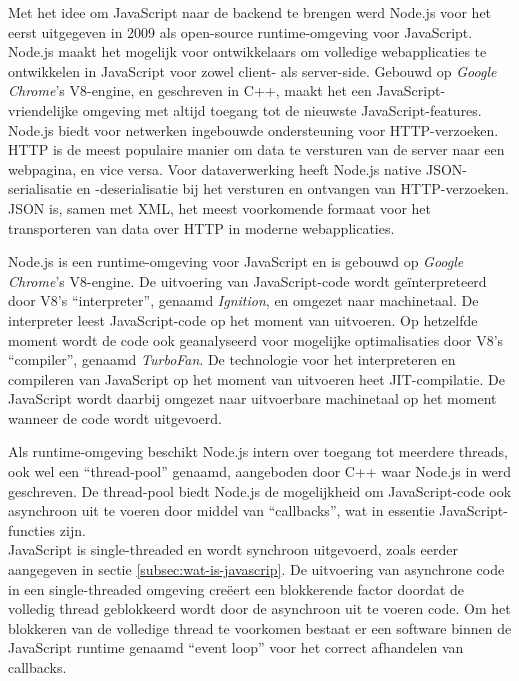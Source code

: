 Met het idee om JavaScript naar de backend te brengen werd Node.js voor het eerst uitgegeven in 2009 als open-source runtime-omgeving voor JavaScript. Node.js maakt het mogelijk voor ontwikkelaars om volledige webapplicaties te ontwikkelen in JavaScript voor zowel client- als server-side. Gebouwd op \emph{Google Chrome}'s V8-engine, en geschreven in C++, maakt het een JavaScript-vriendelijke omgeving met altijd toegang tot de nieuwste JavaScript-features. \\
Node.js biedt voor netwerken ingebouwde ondersteuning voor \gls{HTTP}-verzoeken. \gls{HTTP} is de meest populaire manier om data te versturen van de server naar een webpagina, en vice versa. Voor dataverwerking heeft Node.js native \gls{JSON}-serialisatie en -deserialisatie bij het versturen en ontvangen van \gls{HTTP}-verzoeken. \gls{JSON} is, samen met \gls{XML}, het meest voorkomende formaat voor het transporteren van data over \gls{HTTP} in moderne webapplicaties.

Node.js is een runtime-omgeving voor JavaScript en is gebouwd op \emph{Google Chrome}'s V8-engine. De uitvoering van JavaScript-code wordt geïnterpreteerd door V8's ``interpreter'', genaamd \emph{Ignition}, en omgezet naar machinetaal. De interpreter leest JavaScript-code op het moment van uitvoeren. Op hetzelfde moment wordt de code ook geanalyseerd voor mogelijke optimalisaties door V8's ``compiler'', genaamd \emph{TurboFan}. De technologie voor het interpreteren en compileren van JavaScript op het moment van uitvoeren heet \gls{JIT}-compilatie. De JavaScript wordt daarbij omgezet naar uitvoerbare machinetaal op het moment wanneer de code wordt uitgevoerd.

Als runtime-omgeving beschikt Node.js intern over toegang tot meerdere threads, ook wel een ``thread-pool'' genaamd, aangeboden door C++ waar Node.js in werd geschreven. De thread-pool biedt Node.js de mogelijkheid om JavaScript-code ook asynchroon uit te voeren door middel van ``callbacks'', wat in essentie JavaScript-functies zijn. \\
JavaScript is single-threaded en wordt synchroon uitgevoerd, zoals eerder aangegeven in sectie \ref{subsec:wat-is-javascrip}. De uitvoering van asynchrone code in een single-threaded omgeving creëert een blokkerende factor doordat de volledig thread geblokkeerd wordt door de asynchroon uit te voeren code. Om het blokkeren van de volledige thread te voorkomen bestaat er een software binnen de JavaScript runtime genaamd ``event loop'' voor het correct afhandelen van callbacks.

